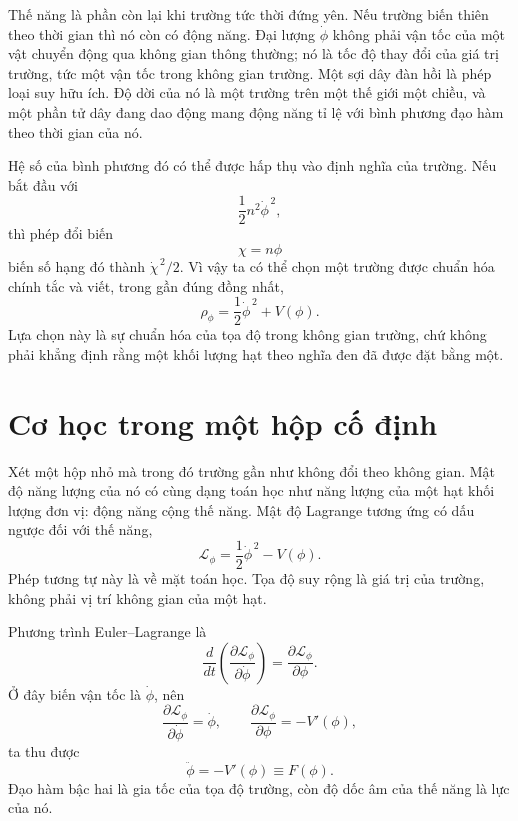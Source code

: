 Thế năng là phần còn lại khi trường tức thời đứng yên. Nếu trường biến thiên theo thời gian thì nó còn có động năng. Đại lượng \(\dot\phi\) không phải vận tốc của một vật chuyển động qua không gian thông thường; nó là tốc độ thay đổi của giá trị trường, tức một vận tốc trong không gian trường. Một sợi dây đàn hồi là phép loại suy hữu ích. Độ dời của nó là một trường trên một thế giới một chiều, và một phần tử dây đang dao động mang động năng tỉ lệ với bình phương đạo hàm theo thời gian của nó.

Hệ số của bình phương đó có thể được hấp thụ vào định nghĩa của trường. Nếu bắt đầu với
\begin{equation}
\frac12 n^2\dot\phi^{\,2},
\end{equation}
thì phép đổi biến
\begin{equation}
\chi=n\phi
\end{equation}
biến số hạng đó thành \(\dot\chi^{\,2}/2\). Vì vậy ta có thể chọn một trường được chuẩn hóa chính tắc và viết, trong gần đúng đồng nhất,
\begin{equation}
\rho_\phi=\frac12\dot\phi^{\,2}+V(\phi).
\label{eq:c09-rho-homogeneous}
\end{equation}
Lựa chọn này là sự chuẩn hóa của tọa độ trong không gian trường, chứ không phải khẳng định rằng một khối lượng hạt theo nghĩa đen đã được đặt bằng một.

\section{Cơ học trong một hộp cố định}

Xét một hộp nhỏ mà trong đó trường gần như không đổi theo không gian. Mật độ năng lượng của nó có cùng dạng toán học như năng lượng của một hạt khối lượng đơn vị: động năng cộng thế năng. Mật độ Lagrange tương ứng có dấu ngược đối với thế năng,
\begin{equation}
\mathcal L_\phi
=\frac12\dot\phi^{\,2}-V(\phi).
\label{eq:c09-lagrangian-density}
\end{equation}
Phép tương tự này là về mặt toán học. Tọa độ suy rộng là giá trị của trường, không phải vị trí không gian của một hạt.

Phương trình Euler--Lagrange là
\begin{equation}
\frac{d}{dt}
\left(
\frac{\partial\mathcal L_\phi}{\partial\dot\phi}
\right)
=
\frac{\partial\mathcal L_\phi}{\partial\phi}.
\label{eq:c09-el-fixed}
\end{equation}
Ở đây biến vận tốc là \(\dot\phi\), nên
\begin{equation}
\frac{\partial\mathcal L_\phi}{\partial\dot\phi}=\dot\phi,
\qquad
\frac{\partial\mathcal L_\phi}{\partial\phi}=-V'(\phi),
\end{equation}
ta thu được
\begin{equation}
\ddot\phi=-V'(\phi)\equiv F(\phi).
\label{eq:c09-fixed-eom}
\end{equation}
Đạo hàm bậc hai là gia tốc của tọa độ trường, còn độ dốc âm của thế năng là lực của nó.

